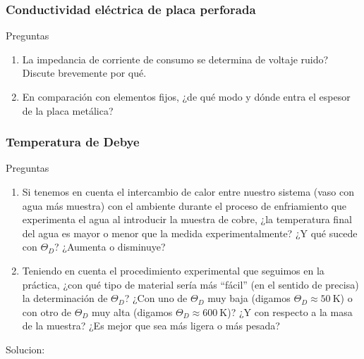\vspace*{2em}

\begin{Enunciado}
	\subsubsection{Conductividad eléctrica de placa perforada}
	Preguntas
	\begin{enumerate}[label=\alph*)]
		\item La impedancia de corriente de consumo se determina de voltaje ruido? Discute brevemente por qué.
		\item En comparación con elementos fijos, ¿de qué modo y dónde entra el espesor de la placa metálica?
	\end{enumerate}
\end{Enunciado}

\vspace*{2em}

\begin{Enunciado}
    \subsubsection{Temperatura de Debye}
    Preguntas
    \begin{enumerate}[label=\alph*)]
    \item Si tenemos en cuenta el intercambio de calor entre nuestro sistema (vaso con agua más muestra) con el ambiente durante el proceso de enfriamiento que experimenta el agua al introducir la muestra de cobre, ¿la temperatura final del agua es mayor o menor que la medida experimentalmente? ¿Y qué sucede con $\Theta_D$? ¿Aumenta o disminuye?
    \item Teniendo en cuenta el procedimiento experimental que seguimos en la práctica, ¿con qué tipo de material sería más “fácil” (en el sentido de precisa) la determinación de $\Theta_D$? ¿Con uno de $\Theta_D$ muy baja (digamos $\Theta_D \approx 50\ \text{K}$) o con otro de $\Theta_D$ muy alta (digamos $\Theta_D \approx 600\ \text{K}$)? ¿Y con respecto a la masa de la muestra? ¿Es mejor que sea más ligera o más pesada?
    \end{enumerate}
\end{Enunciado}

Solucion:

